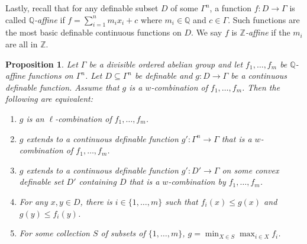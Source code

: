 \documentclass[10pt]{amsart}
\newtheorem{prop}[subsection]{Proposition}
\theoremstyle{definition}
\theoremstyle{remark}
\newcommand{\Q}{\mathbb Q}
\newcommand{\Z}{\mathbb Z}
\theoremstyle{plain}
\theoremstyle{definition}
\begin{document}
Lastly, recall that for any definable subset $D$ of some $\Gamma^n$, a function $f:D\to \Gamma$ is called \emph{$\Q$-affine} if $f=\sum^n_{i=1} m_ix_i+c$ where $m_i\in \Q$ and $c\in \Gamma$. Such functions are the most basic definable continuous functions on $D$. We say $f$ is \emph{$\Z$-affine} if the $m_i$ are all in $\Z$.
\begin{prop}\label{prop:t-l-equiv}
Let $\Gamma$ be a divisible ordered abelian group and let $f_1,\ldots,f_m$ be $\Q$-affine functions on $\Gamma^n$. Let $D\subseteq \Gamma^n$ be definable and $g:D\to \Gamma$ be a continuous definable function. Assume that $g$ is a $w$-combination of $f_1,\ldots,f_m$. Then the following are equivalent:
\begin{enumerate}
\item\label{prop:t-l-equiv1} $g$ is an $\ell$-combination of $f_1,\ldots,f_m$.
\item\label{prop:t-l-equiv2} $g$ extends to a continuous definable function $g':\Gamma^n\to \Gamma$ that is a $w$\nobreakdash-combi\-na\-tion of $f_1,\ldots,f_m$.
\item\label{prop:t-l-equiv3} $g$ extends to a continuous definable function $g':D'\to \Gamma$ on some convex definable set $D'$ containing $D$ that is a $w$-combination by $f_1,\ldots,f_m$.
\item\label{prop:t-l-equiv4} For any $x,y\!\in\! D$, there is $i \!\in\! \{1,\ldots,m\}$ such that $f_i(x)\!\leq\! g(x)$ and $g(y)\!\leq\! f_i(y)$.
\item\label{prop:t-l-equiv5} For some collection $S$ of subsets of $\{1,\ldots,m\}$, $g=\min_{X\in S} \max_{i \in X} f_i$.
\end{enumerate}
\end{prop}
\end{document}
